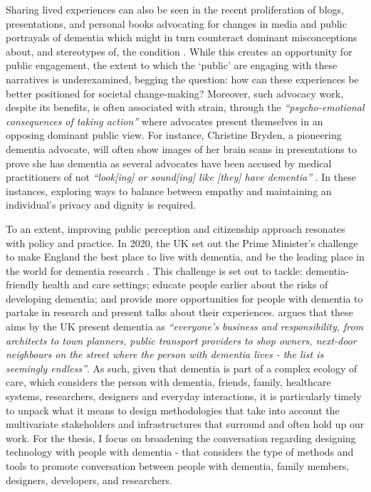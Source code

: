 Sharing lived experiences can also be seen in the recent proliferation of blogs, presentations, and personal books advocating for changes in media and public portrayals of dementia which might in turn counteract dominant misconceptions about, and stereotypes of, the condition \citep{christine_bryden_dancing_2005}.  While this creates an opportunity for public engagement, the extent to which the ‘public’ are engaging with these narratives is underexamined, begging the question: how can these experiences be better positioned for societal change-making? Moreover, such advocacy work, despite its benefits, is often associated with strain, through the \textit{``psycho-emotional consequences of taking action''} \citep{bartlett_citizenship_2014} where advocates present themselves in an opposing dominant public view. For instance, Christine Bryden, a pioneering dementia advocate, will often show images of her brain scans in presentations to prove she has dementia as several advocates have been accused by medical practitioners of not \textit{``look[ing] or sound[ing] like [they] have dementia''} \citep{swaffer_but_2016}. In these instances, exploring ways to balance between empathy and maintaining an individual’s privacy and dignity is required.

To an extent, improving public perception and citizenship approach resonates with policy and practice. In 2020, the UK set out the Prime Minister's challenge to make England the best place to live with dementia, and be the leading place in the world for dementia research \citep{budgett2021designing}. This challenge is set out to tackle: dementia-friendly health and care settings; educate people earlier about the risks of developing dementia; and provide more opportunities for people with dementia to partake in research and present talks about their experiences. \cite{keady2017social} argues that these aims by the UK present dementia as \textit{``everyone's business and responsibility, from architects to town planners, public transport providers to shop owners, next-door neighbours on the street where the person with dementia lives - the list is seemingly endless''}. As such, given that dementia is part of a complex ecology of care, which considers the person with dementia, friends, family, healthcare systems, researchers, designers and everyday interactions, it is particularly timely to unpack what it means to design methodologies that take into account the multivariate stakeholders and infrastructures that surround and often hold up our work. For the thesis, I focus on broadening the conversation regarding designing technology with people with dementia - that considers the type of methods and tools to promote conversation between people with dementia, family members, designers, developers, and researchers.


